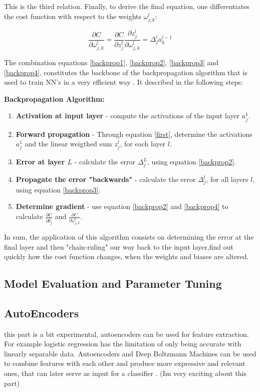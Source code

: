 This is the third relation. Finally, to derive the final equation, one differentiates the cost function with respect to the weights $\omega_{j,k}^l:$

\begin{equation}
\frac{\partial C}{\partial \omega_{j,k}^l} =\frac{\partial C}{\partial z_{j}^l}\frac{\partial z_{j}^l}{\partial \omega_{j,k}^l} = \Delta_j^{l} a_k^{l-1}
\label{backprop4}
\end{equation}

The combination equations \ref{backprop1}, \ref{backprop2}, \ref{backprop3} and \ref{backprop4}, constitutes the backbone of the backpropagation algorithm that is used to train NN's in a very efficient way \cite{ml_phys}. It described in the following steps:

\textbf{Backpropagation Algorithm:}
\begin{enumerate}
	\item \textbf{Activation at input layer} - compute the activations of the input layer $a_j^1$.
	\item \textbf{Forward propagation} - Through equation \ref{first}, determine the activations $a_j^1$ and the linear weigthed sum $z_j^l$, for each layer $l$.
 	\item \textbf{Error at layer $L$} - calculate the error $\Delta_j^L $, using equation \ref{backprop2}.
	\item \textbf{Propagate the error "backwards"} - calculate the error $\Delta_j^l$, for all layers $l$, using equation \ref{backprop3}. 
	\item \textbf{Determine gradient} - use equation \ref{backprop2} and \ref{backprop4} to calculate  $\frac{\partial C}{\partial b_j^l}$ and $\frac{\partial C}{\partial \omega_{j,k}^l}$.
\end{enumerate}
\cite{ml_phys}

In sum, the application  of this algorithm consists on determining the error at the final layer and then "chain-ruling" our way back to the input layer,find out quickly how the cost function changes, when the weights and biases are altered. \cite{nielsenneural}


\subsection{Model Evaluation and Parameter Tuning}


\subsection{AutoEncoders}

this part is a bit experimental, autoencoders can be used for feature extraction. For example logistic regression has the limitation of only being accurate with linearly separable data. Autoencoders and Deep Boltzmann Machines can be used to combine features with each other and produce more expressive and relevant ones, that can later serve as input for a classifier . (Im very exciting about this part)